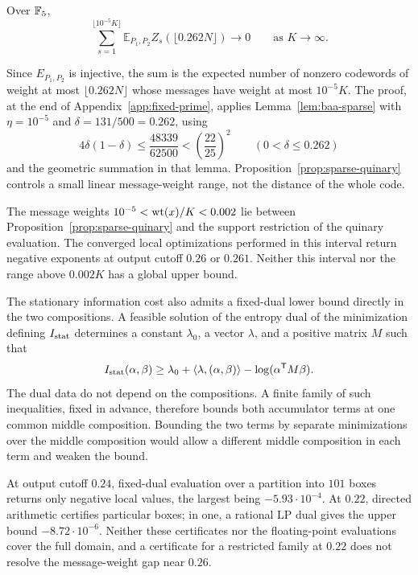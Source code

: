 \begin{proposition}\label{prop:sparse-quinary}
Over $\mathbb F_5$,
\[
 \sum_{s=1}^{\lfloor10^{-5}K\rfloor}
   \mathbb E_{P_1,P_2}Z_s(\lfloor0.262N\rfloor)\longrightarrow0
 \qquad\text{as }K\to\infty.
\]
\end{proposition}

Since $E_{P_1,P_2}$ is injective, the sum is the expected number of nonzero
codewords of weight at most $\lfloor0.262N\rfloor$ whose messages have
weight at most $10^{-5}K$.  The proof, at the end of
Appendix~\ref{app:fixed-prime}, applies Lemma~\ref{lem:baa-sparse} with
$\eta=10^{-5}$ and $\delta=131/500=0.262$, using
\[
  4\delta(1-\delta)\le\frac{48339}{62500}
  <\left(\frac{22}{25}\right)^2
  \qquad(0<\delta\le0.262)
\]
and the geometric summation in that lemma.
Proposition~\ref{prop:sparse-quinary} controls a small linear
message-weight range, not the distance of the whole code.

The message weights $10^{-5}<\operatorname{wt}(x)/K<0.002$ lie between
Proposition~\ref{prop:sparse-quinary} and the support restriction of the
quinary evaluation.  The converged local optimizations performed in this
interval return negative exponents at output cutoff $0.26$ or $0.261$.
Neither this interval nor the range above $0.002K$ has a global upper bound.

The stationary information cost also admits a fixed-dual lower bound directly
in the two compositions.  A feasible solution of the entropy dual of the
minimization defining $I_{\rm stat}$ determines a constant $\lambda_0$, a
vector $\lambda$, and a positive matrix $M$ such that
\[
 I_{\rm stat}(\alpha,\beta)
 \ge \lambda_0+\langle \lambda,(\alpha,\beta)\rangle
       -\log(\alpha^{\mathsf T}M\beta).
\]
The dual data do not depend on the compositions.  A finite family of such
inequalities, fixed in advance, therefore bounds both accumulator terms at
one common middle composition.  Bounding the two terms by separate
minimizations over the middle composition would allow a different middle
composition in each term and weaken the bound.

At output cutoff $0.24$, fixed-dual evaluation over a partition into $101$
boxes returns only negative local values, the largest being
$-5.93\cdot10^{-4}$.  At $0.22$, directed arithmetic certifies particular
boxes; in one, a rational LP dual gives the upper bound
$-8.72\cdot10^{-6}$.  Neither these certificates nor the floating-point
evaluations cover the full domain, and a certificate for a restricted family
at $0.22$ does not resolve the message-weight gap near $0.26$.

